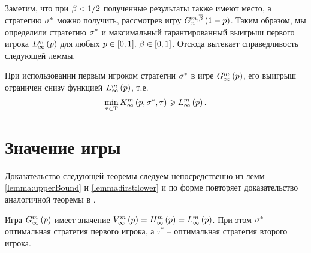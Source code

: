 Заметим, что при $\Co < 1/2$ полученные результаты также имеют место, а
стратегию $\fOpt$ можно получить, рассмотрев игру $\symmGameExpression[n]{1-p}$.
Таким образом, мы определили стратегию $\fOpt$ и максимальный гарантированный
выигрыш первого игрока $\lowerBound{p}$ для любых %
$p \in [0, 1], \, \Co \in [0, 1]$. Отсюда вытекает справедливость следующей
леммы.

\begin{lemma}
  \label{lemma:first:lower}
  При использовании первым игроком стратегии $\fOpt$ в игре
  $\infiniteGame{p}$\textup{,} его выигрыш ограничен снизу функцией
  $\lowerBound{p}$\textup{,} т.е.
  \[
    \min_{\tau \in \Tau} \infiniteFirstPlayerPayoff{p}{\fOpt}{\tau} \geq
    \lowerBound{p}.
  \]
\end{lemma}


\section{Значение игры}

Доказательство следующей теоремы следуем непосредственно из лемм
\ref{lemma:upperBound} и \ref{lemma:first:lower} и по форме повторяет
доказательство аналогичной теоремы в \cite{domansky07}.
\begin{theorem}
  Игра $\infiniteGame{p}$ имеет значение $\infiniteGameValue{p} = \upperBound{p}
  = \lowerBound{p}$. При этом $\fOpt$ -- оптимальная стратегия первого
  игрока\textup{,} а $\tau^*$ -- оптимальная стратегия второго игрока.
\end{theorem}



